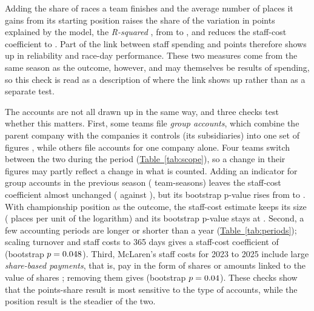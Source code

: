 \documentclass[11pt,a4paper]{article}
\begin{document}
Adding the share of races a team finishes and the average number of places it gains from
its starting position raises the share of the variation in points explained by the model, the \textit{R-squared}
\citep[Chapter~3]{wooldridge2020}, from \RsqBase{} to \RsqOps, and reduces the staff-cost coefficient to \OpsStaff. Part of the link between staff spending and points therefore
shows up in reliability and race-day performance. These two
measures come from the same season as the outcome, however, and may themselves be results of spending, so this check is
read as a description of where the link shows up rather than as a separate test.

The accounts are not all drawn up in the same way, and three checks test whether
this matters. First, some teams file \textit{group accounts}, which combine the parent company with the companies it
controls (its subsidiaries) into one set of figures \citep[s.~404]{companiesact2006}, while others file accounts for one
company alone. Four teams switch between the two during the period (\hyperref[tab:scope]{Table~\ref*{tab:scope}}), so a
change in their figures may partly reflect a change in what is counted. Adding an indicator for group accounts in the
previous season (\ScopeN{} team-seasons) leaves the staff-cost coefficient almost unchanged (\ScopeStaff{} against
\CoefStaffTwfe), but its bootstrap p-value rises from \PwildStaffTwfe{} to \ScopePwildStaff. With championship position as
the outcome, the staff-cost estimate keeps its size (\ScopePosStaff{} places per unit of the logarithm) and its bootstrap
p-value stays at \ScopePosPwildStaff. Second, a few accounting periods are longer or shorter than a year
(\hyperref[tab:periods]{Table~\ref*{tab:periods}}); scaling turnover and staff costs to 365 days gives a staff-cost
coefficient of \AnnStaff{} (bootstrap $p = 0.048$). Third, McLaren's staff costs for 2023 to 2025 include large
\textit{share-based payments}, that is, pay in the form of shares or amounts linked to the value of shares
\citep{ifrs2,ch_mclaren}; removing them gives \SbpStaff{} (bootstrap $p = 0.04$). \RealTerms These checks show
that the points-share result is most sensitive to the type of accounts, while the position result is the steadier of the
two.
\end{document}
